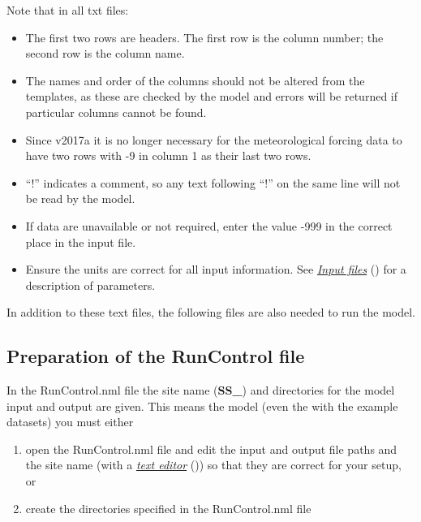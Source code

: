\documentclass[letterpaper,10pt,english]{sphinxmanual}
\begin{document}
Note that in all txt files:
\begin{itemize}
\item {} 
The first two rows are headers. The first row is the column number;
the second row is the column name.

\item {} 
The names and order of the columns should not be altered from the
templates, as these are checked by the model and errors will be
returned if particular columns cannot be found.

\item {} 
Since v2017a it is no longer necessary for the meteorological forcing
data to have two rows with -9 in column 1 as their last two rows.

\item {} 
“!” indicates a comment, so any text following “!” on the same line
will not be read by the model.

\item {} 
If data are unavailable or not required, enter the value -999 in the
correct place in the input file.

\item {} 
Ensure the units are correct for all input information. See {\hyperref[\detokenize{prepare-to-run-the-model:Input_files}]{\emph{Input
files}}} () for a description of parameters.

\end{itemize}

In addition to these text files, the following files are also needed to
run the model.


\subsection{Preparation of the RunControl file}
\label{\detokenize{prepare-to-run-the-model:preparation-of-the-runcontrol-file}}
In the RunControl.nml file the site name ({\color{red}\bfseries{}SS\_}) and directories for the
model input and output are given. This means  the
model (even the with the example datasets) you must either
\begin{enumerate}
\item {} 
open the RunControl.nml file and edit the input and output file paths
and the site name (with a {\hyperref[\detokenize{prepare-to-run-the-model:A_text_editor}]{\emph{text editor}}} ()) so that
they are correct for your setup, or

\item {} 
create the directories specified in the RunControl.nml file

\end{enumerate}
\end{document}
